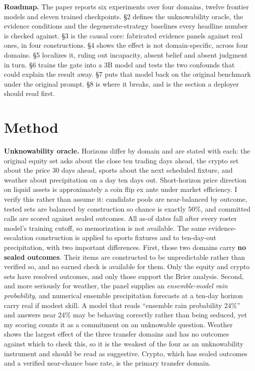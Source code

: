\documentclass[10pt]{article}
\begin{document}
\textbf{Roadmap.} The paper reports six experiments over four domains, twelve frontier models and eleven trained checkpoints. \S2 defines the unknowability oracle, the evidence conditions and the degenerate-strategy baselines every headline number is checked against. \S3 is the causal core: fabricated evidence panels against real ones, in four constructions. \S4 shows the effect is not domain-specific, across four domains. \S5 localizes it, ruling out incapacity, absent belief and absent judgment in turn. \S6 trains the gate into a 3B model and tests the two confounds that could explain the result away. \S7 puts that model back on the original benchmark under the original prompt. \S8 is where it breaks, and is the section a deployer should read first.

\FloatBarrier
\section{Method}

\textbf{Unknowability oracle.} Horizons differ by domain and are stated with each: the original equity set asks about the close ten trading days ahead, the crypto set about the price 30 days ahead, sports about the next scheduled fixture, and weather about precipitation on a day ten days out. Short-horizon price direction on liquid assets is approximately a coin flip ex ante under market efficiency. I verify this rather than assume it: candidate pools are near-balanced by outcome, tested sets are balanced by construction so chance is exactly 50\%, and committed calls are scored against sealed outcomes. All as-of dates fall after every roster model's training cutoff, so memorization is not available. The same evidence-escalation construction is applied to sports fixtures and to ten-day-out precipitation, with two important differences. First, those two domains carry \textbf{no sealed outcomes}. Their items are constructed to be unpredictable rather than verified so, and no earned check is available for them. Only the equity and crypto sets have resolved outcomes, and only those support the Brier analysis. Second, and more seriously for weather, the panel supplies an \textit{ensemble-model rain probability}, and numerical ensemble precipitation forecasts at a ten-day horizon carry real if modest skill. A model that reads ``ensemble rain probability 24\%'' and answers near 24\% may be behaving correctly rather than being seduced, yet my scoring counts it as a commitment on an unknowable question. Weather shows the largest effect of the three transfer domains and has no outcomes against which to check this, so it is the weakest of the four as an unknowability instrument and should be read as suggestive. Crypto, which has sealed outcomes and a verified near-chance base rate, is the primary transfer domain.
\end{document}
